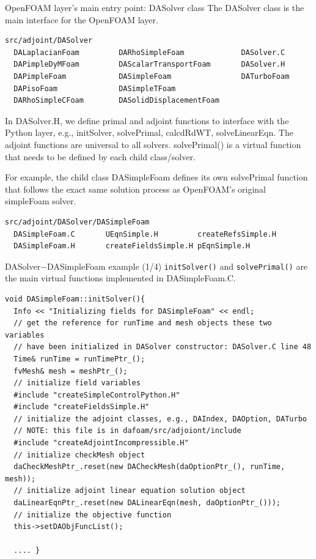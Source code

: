\documentclass{bredelebeamer}
\begin{document}
\begin{frame}[fragile]{OpenFOAM layer's main entry point: DASolver class}
The DASolver class is the main interface for the OpenFOAM layer.
\footnotesize
\lstset{ language=bash }
\begin{lstlisting}
src/adjoint/DASolver
  DALaplacianFoam         DARhoSimpleFoam             DASolver.C
  DAPimpleDyMFoam         DAScalarTransportFoam       DASolver.H
  DAPimpleFoam            DASimpleFoam                DATurboFoam
  DAPisoFoam              DASimpleTFoam
  DARhoSimpleCFoam        DASolidDisplacementFoam
\end{lstlisting}
\normalsize

In DASolver.H, we define primal and adjoint functions to interface with the Python layer, e.g., initSolver, solvePrimal, calcdRdWT, solveLinearEqn. The adjoint functions are universal to all solvers. solvePrimal() is a virtual function that needs to be defined by each child class/solver. 

For example, the child class DASimpleFoam defines its own solvePrimal function that follows the exact same solution process as OpenFOAM's original simpleFoam solver.

\footnotesize
\lstset{ language=bash }
\begin{lstlisting}
src/adjoint/DASolver/DASimpleFoam
  DASimpleFoam.C       UEqnSimple.H         createRefsSimple.H
  DASimpleFoam.H       createFieldsSimple.H pEqnSimple.H
\end{lstlisting}
\normalsize
\end{frame}

\begin{frame}[fragile]{DASolver$-$DASimpleFoam example (1/4)}
\texttt{initSolver()} and \texttt{solvePrimal()} are the main virtual functions implemented in DASimpleFoam.C.
\footnotesize
\lstset{ language=c++ }
\begin{lstlisting}
void DASimpleFoam::initSolver(){
  Info << "Initializing fields for DASimpleFoam" << endl;
  // get the reference for runTime and mesh objects these two variables 
  // have been initialized in DASolver constructor: DASolver.C line 48
  Time& runTime = runTimePtr_();
  fvMesh& mesh = meshPtr_();
  // initialize field variables
  #include "createSimpleControlPython.H"
  #include "createFieldsSimple.H"
  // initialize the adjoint classes, e.g., DAIndex, DAOption, DATurbo
  // NOTE: this file is in dafoam/src/adjoiont/include
  #include "createAdjointIncompressible.H"
  // initialize checkMesh object
  daCheckMeshPtr_.reset(new DACheckMesh(daOptionPtr_(), runTime, mesh));
  // initialize adjoint linear equation solution object
  daLinearEqnPtr_.reset(new DALinearEqn(mesh, daOptionPtr_()));
  // initialize the objective function
  this->setDAObjFuncList();

  .... }
\end{lstlisting}
\normalsize

\end{frame}
\end{document}
